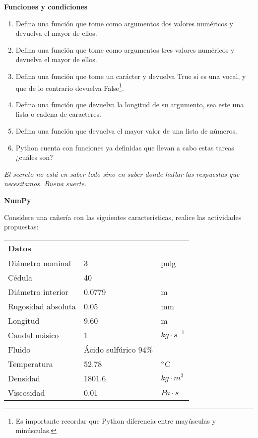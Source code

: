 \documentclass[12pt, oneside, a4paper, spanish]{article}
\begin{document}
\textbf{Funciones y condiciones}
\begin{enumerate}
	\item Defina una función que tome como argumentos dos valores numéricos y devuelva el mayor de ellos. 
	\item Defina una función que tome como argumentos tres valores numéricos y devuelva el mayor de ellos.
	\item Defina una función que tome un carácter y devuelva True si es una vocal, y que de lo contrario devuelva False\footnote{Es importante recordar que Python diferencia entre mayúsculas y minúsculas.}.
	\item Defina una función que devuelva la longitud de su argumento, sea este una lista o cadena de caracteres.
	\item Defina una función que devuelva el mayor valor de una lista de números.
	\item Python cuenta con funciones ya definidas que llevan a cabo estas tareas ¿cuáles son?
\end{enumerate}

\begin{center}
	\textit{El secreto no está en saber todo sino en saber donde hallar las respuestas que necesitamos. Buena suerte.}
\end{center}

\newpage

\textbf{NumPy}

Considere una cañería con las siguientes características, realice las actividades propuestas:

\begin{table}[h]
	\centering
	\begin{tabular}{lll}
		\toprule
		Datos &&\\ 
		\midrule
		Diámetro nominal&3&pulg\\
		Cédula&40&\\
		Diámetro interior&0.0779&m\\
		Rugosidad absoluta&0.05&mm\\
		Longitud&9.60&m\\
		Caudal másico&1&$kg \cdot s^{-1}$\\
		Fluido&Ácido sulfúrico 94\%&\\
		Temperatura&52.78&$\degree$C\\
		Densidad&1801.6&$kg \cdot m^{3}$\\
		Viscosidad&0.01&$Pa \cdot s$ \\
		\bottomrule
	\end{tabular}
\end{table}  
\end{document}
